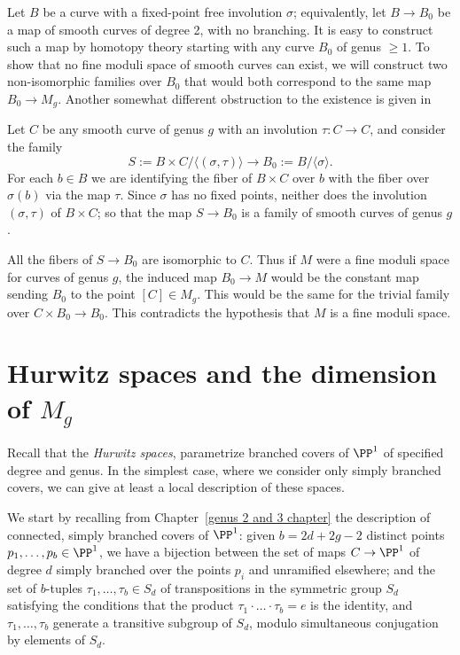 Let $B$ be a curve with a fixed-point free involution $\sigma$; equivalently, let $B \to B_0$ be a map of smooth curves of degree 2, with no branching. It is easy to construct such a map by homotopy theory starting with any curve $B_0$ of genus $\geq 1$. 
To show that no fine moduli space of smooth curves can exist, we will construct two non-isomorphic families over $B_0$ that
would both correspond to the same map $B_0\to M_g$. Another somewhat different obstruction to the existence is given in 
\cite[Chapter 6]{DE-JH-schemes}

Let $C$ be any smooth curve of genus $g$ with an involution $\tau : C \to C$, and consider the family
$$
S := B \times C/\langle (\sigma, \tau) \rangle \to B_0 := B/\langle \sigma \rangle.
$$
For each $b \in B$ we are identifying the fiber of $B \times C$ over $b$ with the fiber over $\sigma(b)$ via the map $\tau$. Since $\sigma$ has no fixed points, neither does the involution $(\sigma, \tau)$ of $B \times C$; so that the map $S \to B_0$ is a family of smooth curves of genus $g$.

All the fibers of $S \to B_0$ are isomorphic to $C$. Thus if $M$ were a fine moduli space for curves of genus $g$,
 the induced map $B_0 \to M$ would be the constant map sending $B_0$ to the point $[C] \in M_g$. This would be the
 same for the trivial family over $C\times B_0 \to B_0$. This contradicts the hypothesis that $M$ is a fine moduli space. 


\section{Hurwitz spaces and the dimension of $M_g$}\label{Hurwitz section}

Recall that the \emph{Hurwitz spaces},  parametrize branched covers of $\PP^1$ of specified degree and genus. In the simplest case, where we consider only simply branched covers, we can give at least a local description of these spaces. 

We start by recalling from Chapter~\ref{genus 2 and 3 chapter} the description of connected, simply branched covers of $\PP^1$: given $b = 2d + 2g - 2$ distinct points $p_1,\dots,p_b \in \PP^1$, we have a  bijection between the set of maps $C \to \PP^1$ of degree $d$ simply branched over the points $p_i$ and unramified elsewhere; and the set of $b$-tuples $\tau_1, \dots, \tau_b \in S_d$ of transpositions in the symmetric group $S_d$
satisfying the conditions that the product $\tau_1\cdot \dots \cdot \tau_b = e$ is the identity, and $\tau_1, \dots, \tau_b$ generate a transitive subgroup of $S_d$, modulo simultaneous conjugation by elements of $S_d$. 

